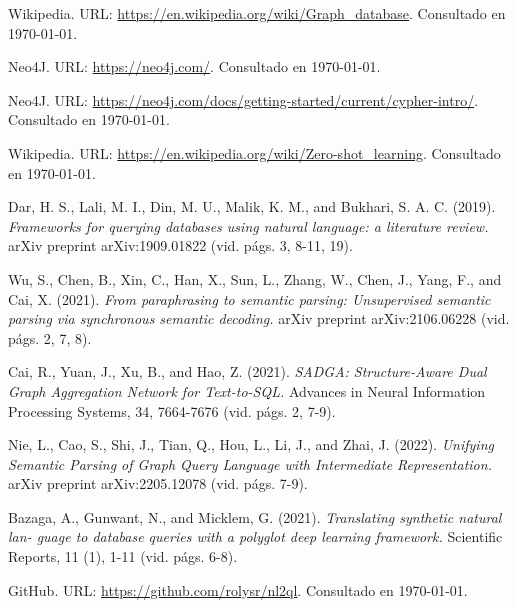 \documentclass[a4paper,10pt,twocolumn]{article}
\begin{document}
\begin{thebibliography}{99}
	
	 Wikipedia. URL: \href{https://en.wikipedia.org/wiki/Graph_database}
	  {https://en.wikipedia.org/wiki/Graph\_database}.
		Consultado en \today.

	 Neo4J. URL: \href{https://neo4j.com/}
	  {https://neo4j.com/}.
		Consultado en \today.

	 Neo4J. URL: \href{https://neo4j.com/docs/getting-started/current/cypher-intro/}
	  {https://neo4j.com/docs/getting-started/current/cypher-intro/}.
		Consultado en \today.

	 Wikipedia. URL: \href{https://en.wikipedia.org/wiki/Zero-shot_learning}
	  {https://en.wikipedia.org/wiki/Zero-shot\_learning}.
		Consultado en \today.

	 Dar, H. S., Lali, M. I., Din, M. U., Malik, K. M., and Bukhari, S. A. C. (2019). \emph{Frameworks for querying databases using natural language: a literature review.}
		arXiv preprint arXiv:1909.01822 (vid. págs. 3, 8-11, 19).

	 Wu, S., Chen, B., Xin, C., Han, X., Sun, L., Zhang, W., Chen, J., Yang, F., and Cai, X. (2021). \emph{From paraphrasing to semantic parsing: Unsupervised semantic parsing via synchronous semantic decoding.}
		arXiv preprint arXiv:2106.06228 (vid. págs. 2, 7, 8).

	 Cai, R., Yuan, J., Xu, B., and Hao, Z. (2021). \emph{SADGA: Structure-Aware Dual Graph
	Aggregation Network for Text-to-SQL.}
		Advances in Neural Information Processing Systems, 34, 7664-7676 (vid. págs. 2, 7-9).

	 Nie, L., Cao, S., Shi, J., Tian, Q., Hou, L., Li, J., and Zhai, J. (2022). \emph{Unifying Semantic Parsing of Graph Query Language with Intermediate Representation.}
		arXiv preprint arXiv:2205.12078 (vid. págs. 7-9).

	 Bazaga, A., Gunwant, N., and Micklem, G. (2021). \emph{Translating synthetic natural lan-
	guage to database queries with a polyglot deep learning framework.}
		Scientific Reports, 11 (1), 1-11 (vid. págs. 6-8).

	 GitHub. URL: \href{https://github.com/rolysr/nl2ql}
	  {https://github.com/rolysr/nl2ql}.
		Consultado en \today.


\end{thebibliography}
\end{document}
